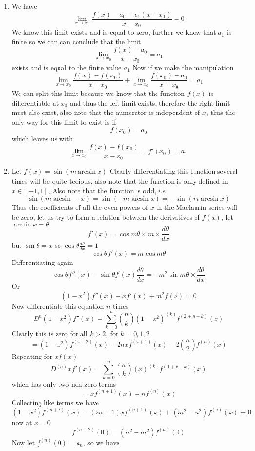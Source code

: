 \documentclass[12pt]{article}
\begin{document}
\begin{enumerate}
		\item
			We have
			$$
			\lim_{ x \to x_{0} } \frac{f(x) -a_{0} -a_{1}(x-x_{0})}{x-x_{0}} = 0
			$$
			We know this limit exists and is equal to zero, further we know that $a_{1}$
			is finite so we can can conclude that the limit
			$$
			\lim_{ x \to x_{0} } \frac{f(x)-a_{0}}{x-x_{0}} = a_{1}
			$$
			exists and is equal to the finite value $a_{1}$ Now if we make the manipulation
			$$
			\lim_{ x \to x_{0} } \frac{f(x)-f(x_{0})}{x-x_{0}} + \lim_{ x \to x_{0} } \frac{f(x_{0})-a_{0}}{x-x_{0}} = a_{1}
			$$
			We can split this limit because we know that the function $f(x)$ is differentiable at $x_{0}$ and thus the left limit exists, therefore the right limit must also exist, also note that the numerator is independent of $x$, thus the only way for this limit to exist is if
			$$
			f(x_{0}) = a_{0}
			$$
			which leaves us with
			$$
			\lim_{ x \to x_{0} } \frac{f(x)-f(x_{0})}{x-x_{0}} = f'(x_{0}) = a_{1}
			$$
		\item
			Let $f(x) = \sin(m \arcsin x)$
			Clearly differentiating this function several times will be quite tedious, also note that the function is only defined in $x \in [-1,1]$, Also note that the function is odd, $i$.$e$ 
			$$
			\sin(m \arcsin -x) = \sin(-m \arcsin x) = -\sin (m \arcsin x)
			$$
			Thus the coefficients of all the even powers of $x$ in the Maclaurin series will be zero, let us try to form a relation between the derivatives of $f(x)$, let $\arcsin x  =\theta$
			$$
			f'(x) = \cos m\theta \times m\times \frac{d\theta}{dx}
			$$
			but $\sin \theta  = x$ so $\cos \theta \frac{ d\theta}{dx} = 1$
			$$
			\cos \theta f'(x) = m\cos m\theta
			$$
			Differentiating again
			$$
			\cos \theta f''(x) -\sin \theta f'(x) \frac{d\theta}{dx} = -m^{2}\sin m\theta  \times \frac{d\theta}{dx}
			$$
			Or
			$$
			(1-x^{2})f''(x)-xf'(x)+ m^{2}f(x) = 0
			$$
			Now differentiate this equation $n$ times
			$$
			D^{n}(1-x^{2})f''(x) = \sum_{k=0}^{n} \binom{n}{k} (1-x^{2})^{(k)} f^{(2 + n-k)}(x)
			$$
			Clearly this is zero for all $k>2$, for $k=0,1,2$
			$$
			= (1-x^{2})f^{(n+2)}(x) -2nxf^{(n+1)}(x) -2\binom{n}{2} f^{(n)}(x)
			$$
			Repeating for $xf(x)$
			$$
			D^{(n)}xf'(x)= \sum_{k=0}^{n} \binom{n}{k} (x)^{(k)} f^{(1 + n-k)}(x)
			$$
			which has only two non zero terms
			$$
			=xf^{(n+1)}(x) + nf^{(n)}(x)
			$$
			Collecting like terms we have
			$$
			(1-x^{2})f^{(n+2)}(x) - (2n+1)xf^{(n+1)}(x) + (m^{2}-n^{2})f^{(n)}(x) = 0
			$$
			now at $x=0$
			$$
			f^{(n+2)}(0) = (n^{2}-m^{2}) f^{(n)} (0)
			$$
			Now let $f^{(n)}(0) = a_{n}$, so we have
			$$
$$
\end{enumerate}
\end{document}
